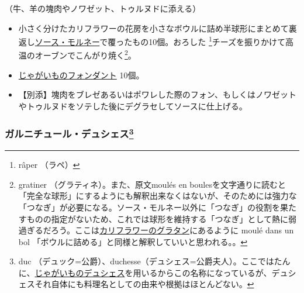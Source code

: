 \begin{recette}


（牛、羊の塊肉やノワゼット、トゥルヌドに添える）

\begin{itemize}
\item
  小さく分けたカリフラワーの花房を小さなボウルに詰め半球形にまとめて裏返し\protect\hyperlink{sauce-mornay}{ソース・モルネー}で覆ったもの10個。おろした
  \footnote{râper （ラペ）}チーズを振りかけて高温のオーブンでこんがり焼く\footnote{gratiner
    （グラティネ）。また、原文moulés en
    boulesを文字通りに読むと「完全な球形」にするようにも解釈出来なくはないが、そのためには強力な「つなぎ」が必要になる。ソース・モルネー以外に「つなぎ」の役割を果たすものの指定がないため、これでは球形を維持する「つなぎ」として熱に弱過ぎるだろう。ここは\protect\hyperlink{chou-fleur-au-gratin}{カリフラワーのグラタン}にあるように
    moulé dans un bol
    「ボウルに詰める」と同様と解釈していいと思われる。。}。
\item
  \protect\hyperlink{pommes-de-terre-fondantes}{じゃがいものフォンダント}
  10個。
\item
  【別添】塊肉をブレゼあるいはポワレした際のフォン、もしくはノワゼットやトゥルヌドをソテした後にデグラセしてソースに仕上げる。
\end{itemize}

\atoaki{}

\hypertarget{garniture-duchesse}{%
\subsubsection[ガルニチュール・デュシェス]{\texorpdfstring{ガルニチュール・デュシェス\footnote{duc
  （デュック=公爵）、duchesse（デュシェス=公爵夫人）。ここではたんに、\protect\hyperlink{pommes-de-terre-duchesse}{じゃがいものデュシェス}を用いるからこの名称になっているが、デュシェスそれ自体にも料理名としての由来や根拠はほとんどない。}}{ガルニチュール・デュシェス}}\label{garniture-duchesse}}




\end{recette}
